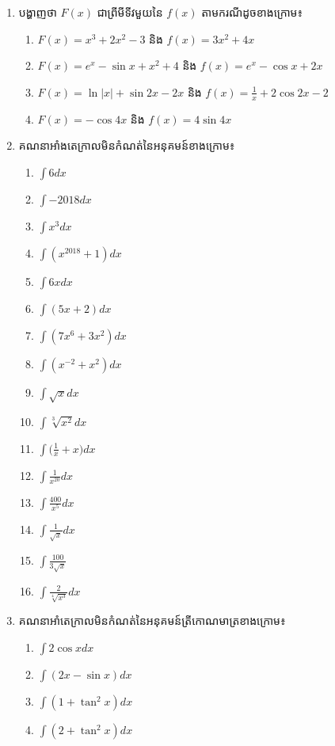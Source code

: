 \documentclass[12pt, a4paper]{article}
\begin{document}
\maketitle
\begin{enumerate}[m]
	\item បង្ហាញថា $F(x)$ ជាព្រីមីទីវមួយនៃ $f(x)$ តាមករណីដូចខាងក្រោម៖
	\begin{enumerate}[k]
		\item $F(x)=x^3+2x^2-3$ និង $f(x)=3x^2+4x$
		\item $F(x)=e^x-\sin x +x^2+4$ និង $f(x)=e^x-\cos x +2x$
		\item $F(x)=\ln|x|+\sin2x-2x$ និង $f(x)=\frac{1}{x}+2\cos2x -2$
		\item $F(x)=-\cos4x$ និង $f(x)=4\sin4x$
	\end{enumerate}
	\item គណនាអាំងតេក្រាលមិនកំណត់នៃអនុគមន៍ខាងក្រោម៖
	\begin{enumerate}[k, 4]
		\item $\int 6 dx$
		\item $\int -2018 dx$
		\item $\int x^3 dx$
		\item $\int (x^{2018}+1) dx$
		\item $\int 6x dx$
		\item $\int (5x+2) dx$
		\item $\int (7x^6+3x^2) dx$
		\item $\int (x^{-2}+x^2) dx$
		\item $\int \sqrt{x} dx$
		\item $\int \sqrt[3]{x^2} dx$
		\item $\int \bigg(\frac{1}{x}+x\bigg) dx$
		\item $\int \frac{1}{x^{20}} dx$
		\item $\int \frac{400}{x^5} dx$
		\item $\int \frac{1}{\sqrt{x}} dx$
		\item $\int \frac{100}{3\sqrt{x}}$
		\item $\int \frac{2}{\sqrt[4]{x^3}} dx$
	\end{enumerate}
	\item គណនាអាំតេក្រាលមិនកំណត់នៃអនុគមន៍ត្រីកោណមាត្រខាងក្រោម៖
	\begin{enumerate}[k, 4]
		\item $\int 2\cos x dx$
		\item $\int (2x-\sin x) dx$
		\item $\int (1+\tan^2x) dx$
		\item $\int (2+\tan^2x) dx$

\end{enumerate}
\end{enumerate}
\end{document}
